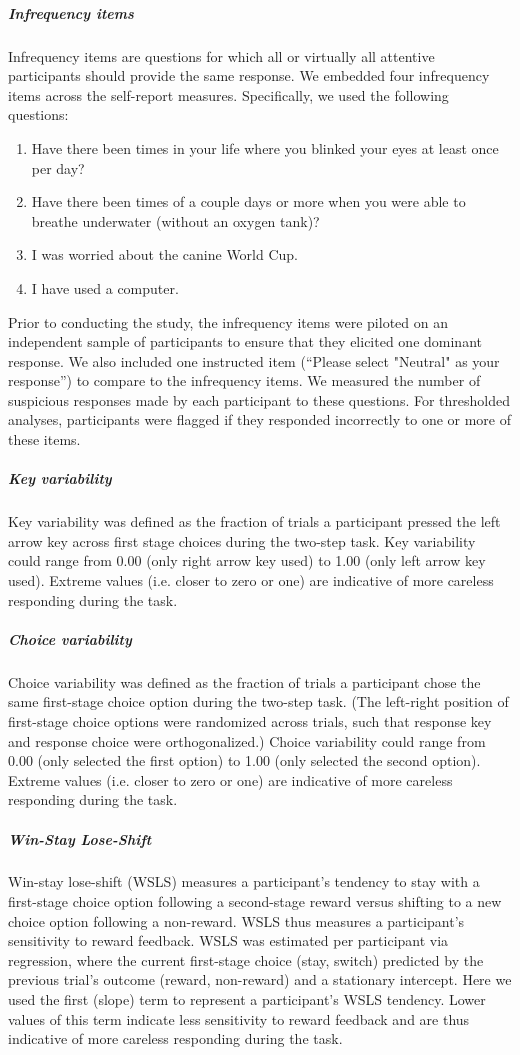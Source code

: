 \documentclass[a4paper,notitlepage,12pt]{article}
\begin{document}
\begin{refsection}[supp]
\subparagraph{Infrequency items} 

Infrequency items are questions for which all or virtually all attentive participants should provide the same response. We embedded four infrequency items across the self-report measures. Specifically, we used the following questions:

\begin{enumerate}
  \item Have there been times in your life where you blinked your eyes at least once per day?
  \item Have there been times of a couple days or more when you were able to breathe underwater (without an oxygen tank)?
  \item I was worried about the canine World Cup.
  \item I have used a computer.
\end{enumerate}

Prior to conducting the study, the infrequency items were piloted on an independent sample of participants to ensure that they elicited one dominant response. We also included one instructed item (``Please select "Neutral" as your response'') to compare to the infrequency items. We measured the number of suspicious responses made by each participant to these questions. For thresholded analyses, participants were flagged if they responded incorrectly to one or more of these items. 

\subparagraph{Key variability} Key variability was defined as the fraction of trials a participant pressed the left arrow key across first stage choices during the two-step task. Key variability could range from 0.00 (only right arrow key used) to 1.00 (only left arrow key used). Extreme values (i.e. closer to zero or one) are indicative of more careless responding during the task.  

\subparagraph{Choice variability} Choice variability was defined as the fraction of trials a participant chose the same first-stage choice option during the two-step task. (The left-right position of first-stage choice options were randomized across trials, such that response key and response choice were orthogonalized.) Choice variability could range from 0.00 (only selected the first option) to 1.00 (only selected the second option). Extreme values (i.e. closer to zero or one) are indicative of more careless responding during the task.  

\subparagraph{Win-Stay Lose-Shift} Win-stay lose-shift (WSLS) measures a participant's tendency to stay with a first-stage choice option following a second-stage reward versus shifting to a new choice option following a non-reward. WSLS thus measures a participant's sensitivity to reward feedback. WSLS was estimated per participant via regression, where the current first-stage choice (stay, switch) predicted by the previous trial's outcome (reward, non-reward) and a stationary intercept. Here we used the first (slope) term to represent a participant's WSLS tendency. Lower values of this term indicate less sensitivity to reward feedback and are thus indicative of more careless responding during the task.


\end{refsection}
\end{document}
